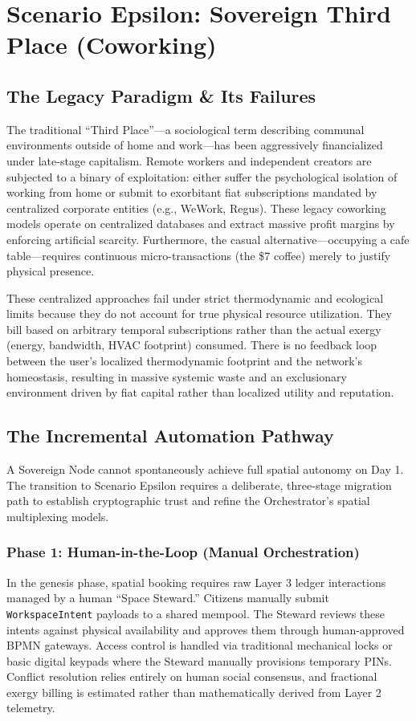 \chapter{Scenario Epsilon: Sovereign Third Place (Coworking)}
\label{ch:epsilon}

\section{The Legacy Paradigm \& Its Failures}
The traditional ``Third Place''---a sociological term describing communal environments outside of home and work---has been aggressively financialized under late-stage capitalism. Remote workers and independent creators are subjected to a binary of exploitation: either suffer the psychological isolation of working from home or submit to exorbitant fiat subscriptions mandated by centralized corporate entities (e.g., WeWork, Regus). These legacy coworking models operate on centralized databases and extract massive profit margins by enforcing artificial scarcity. Furthermore, the casual alternative---occupying a cafe table---requires continuous micro-transactions (the \$7 coffee) merely to justify physical presence. 

These centralized approaches fail under strict thermodynamic and ecological limits because they do not account for true physical resource utilization. They bill based on arbitrary temporal subscriptions rather than the actual exergy (energy, bandwidth, HVAC footprint) consumed. There is no feedback loop between the user's localized thermodynamic footprint and the network's homeostasis, resulting in massive systemic waste and an exclusionary environment driven by fiat capital rather than localized utility and reputation.

\section{The Incremental Automation Pathway}
A Sovereign Node cannot spontaneously achieve full spatial autonomy on Day 1. The transition to Scenario Epsilon requires a deliberate, three-stage migration path to establish cryptographic trust and refine the Orchestrator's spatial multiplexing models.

\subsection{Phase 1: Human-in-the-Loop (Manual Orchestration)}
In the genesis phase, spatial booking requires raw Layer 3 ledger interactions managed by a human ``Space Steward.'' Citizens manually submit \texttt{WorkspaceIntent} payloads to a shared mempool. The Steward reviews these intents against physical availability and approves them through human-approved BPMN gateways. Access control is handled via traditional mechanical locks or basic digital keypads where the Steward manually provisions temporary PINs. Conflict resolution relies entirely on human social consensus, and fractional exergy billing is estimated rather than mathematically derived from Layer 2 telemetry.

